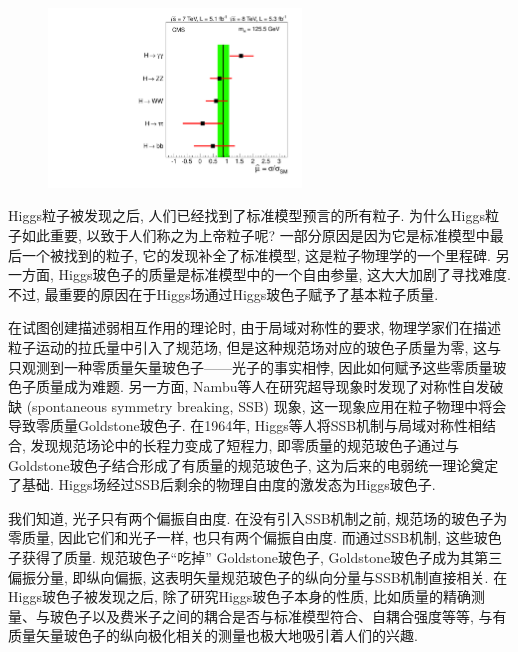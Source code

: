 \documentclass{SCIS2020cn}
\begin{document}
\begin{figure}[ht!]
\centering
\includegraphics[width=2.65104in]{Figure-2.pdf}
\label{fig:2}
\end{figure}

Higgs粒子被发现之后, 人们已经找到了标准模型预言的所有粒子. 为什么Higgs粒子如此重要, 以致于人们称之为上帝粒子呢? 一部分原因是因为它是标准模型中最后一个被找到的粒子, 它的发现补全了标准模型, 这是粒子物理学的一个里程碑. 另一方面, Higgs玻色子的质量是标准模型中的一个自由参量, 这大大加剧了寻找难度. 不过, 最重要的原因在于Higgs场通过Higgs玻色子赋予了基本粒子质量. 

在试图创建描述弱相互作用的理论时, 由于局域对称性的要求, 物理学家们在描述粒子运动的拉氏量中引入了规范场, 但是这种规范场对应的玻色子质量为零, 这与只观测到一种零质量矢量玻色子——光子的事实相悖, 因此如何赋予这些零质量玻色子质量成为难题. 另一方面, Nambu等人在研究超导现象时发现了对称性自发破缺 (spontaneous symmetry breaking, SSB) 现象, 这一现象应用在粒子物理中将会导致零质量Goldstone玻色子. 在1964年, Higgs等人将SSB机制与局域对称性相结合, 发现规范场论中的长程力变成了短程力, 即零质量的规范玻色子通过与Goldstone玻色子结合形成了有质量的规范玻色子, 这为后来的电弱统一理论奠定了基础. Higgs场经过SSB后剩余的物理自由度的激发态为Higgs玻色子.

我们知道, 光子只有两个偏振自由度. 在没有引入SSB机制之前, 规范场的玻色子为零质量, 因此它们和光子一样, 也只有两个偏振自由度. 而通过SSB机制, 这些玻色子获得了质量. 规范玻色子``吃掉'' Goldstone玻色子, Goldstone玻色子成为其第三偏振分量, 即纵向偏振, 这表明矢量规范玻色子的纵向分量与SSB机制直接相关. 在Higgs玻色子被发现之后, 除了研究Higgs玻色子本身的性质, 比如质量的精确测量、与玻色子以及费米子之间的耦合是否与标准模型符合、自耦合强度等等, 与有质量矢量玻色子的纵向极化相关的测量也极大地吸引着人们的兴趣. 
\end{document}
